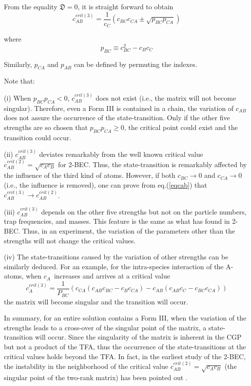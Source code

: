 \documentclass[single-column,showpacs,groupedaddress]{revtex4}
\begin{document}
From the equality $\mathfrak{D}=0$, it is straight forward to obtain
\begin{equation}
c_{AB}^{crit(3)}=\frac{1}{c_{C}}(c_{BC}c_{CA}\pm \sqrt{p_{BC}p_{CA}})
\label{eqcab}
\end{equation}

where
\begin{equation}
p_{BC}\equiv c_{BC}^{2}-c_{B}c_{C}  \label{eqpbc}
\end{equation}

Similarly, $p_{CA}$ and $p_{AB}$ can be defined by permuting the indexes.

Note that:

(i) When $p_{BC}p_{CA}<0$, $c_{AB}^{crit(3)}$ does not exist (i.e., the
matrix will not become singular). Therefore, even a Form III is contained in
a chain, the variation of $c_{AB}$ does not assure the occurrence of the
state-transition. Only if the other five strengths are so chosen that $%
p_{BC}p_{CA}\geq 0$, the critical point could exist and the transition could
occur.

(ii) $c_{AB}^{crit(3)}$ deviates remarkably from the well known critical
value $c_{AB}^{crit(2)}=\sqrt{c_{A}c_{B}}$ for 2-BEC. Thus, the
state-transition is remarkably affected by the influence of the third kind
of atoms. However, if both $c_{BC}\rightarrow 0$ and $c_{CA}\rightarrow 0$
(i.e., the influence is removed), one can prove from eq.(\ref{eqcab}) that $%
c_{AB}^{crit(3)}\rightarrow c_{AB}^{crit(2)}$.

(iii) $c_{AB}^{crit(3)}$ depends on the other five strengths but not on the
particle numbers, trap frequencies, and masses. This feature is the same as
what has found in 2-BEC. Thus, in an experiment, the variation of the
parameters other than the strengths will not change the critical values.

(iv) The state-transitions caused by the variation of other strengths can be
similarly deduced. For an example, for the intra-species interaction of the
A-atoms, when $c_{A}$\ increases and arrives at a critical value
\begin{equation}
c_{A}^{crit(3)}=\frac{1}{P_{BC}}%
(c_{CA}(c_{AB}c_{BC}-c_{B}c_{CA})-c_{AB}(c_{AB}c_{C}-c_{BC}c_{CA}))
\label{eqca}
\end{equation}%
the matrix will become singular and the transition will occur.

In summary, for an entire solution contains a Form III, when the variation
of the strengths leads to a cross-over of the singular point of the matrix,
a state-transition will occur. Since the singularity of the matrix is
inherent in the CGP but not a product of the TFA, thus the occurrence of the
state-transitions at the critical values holds beyond the TFA. In fact, in
the earliest study of the 2-BEC, the instability in the neighborhood of the
critical value $c_{AB}^{crit(2)}=\sqrt{c_{A}c_{B}}$ (the singular point of
the two-rank matrix) has been pointed out \cite{ho96}.
\end{document}
